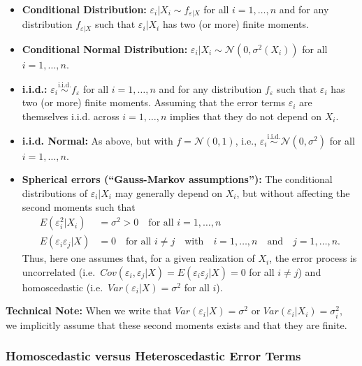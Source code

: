 \documentclass[
  letterpaper,
  DIV=11,
  numbers=noendperiod]{scrreprt}
\providecommand{\tightlist}{%
  \setlength{\itemsep}{0pt}\setlength{\parskip}{0pt}}\usepackage{longtable,booktabs,array}
\theoremstyle{definition}
\theoremstyle{plain}
\theoremstyle{plain}
\theoremstyle{remark}
\begin{document}
\begin{itemize}
\tightlist
\item
  \textbf{Conditional Distribution:}
  \(\varepsilon_i|X_i \sim f_{\varepsilon|X}\) for all \(i=1,\dots,n\)
  and for any distribution \(f_{\varepsilon|X}\) such that
  \(\varepsilon_i|X_i\) has two (or more) finite moments.
\item
  \textbf{Conditional Normal Distribution:}
  \(\varepsilon_i|X_i \sim \mathcal{N}(0,\sigma^2(X_i))\) for all
  \(i=1,\dots,n\).
\item
  \textbf{i.i.d.:}
  \(\varepsilon_i\overset{\operatorname{i.i.d.}}{\sim}f_\varepsilon\)
  for all \(i=1,\dots,n\) and for any distribution \(f_\varepsilon\)
  such that \(\varepsilon_i\) has two (or more) finite moments. Assuming
  that the error terms \(\varepsilon_i\) are themselves i.i.d. across
  \(i=1,\dots,n\) implies that they do not depend on \(X_i\).
\item
  \textbf{i.i.d. Normal:} As above, but with \(f=\mathcal{N}(0,1)\),
  i.e.,
  \(\varepsilon_i\overset{\operatorname{i.i.d.}}{\sim}\mathcal{N}(0,\sigma^2)\)
  for all \(i=1,\dots,n\).
\item
  \textbf{Spherical errors (``Gauss-Markov assumptions''):} The
  conditional distributions of \(\varepsilon_i|X_i\) may generally
  depend on \(X_i\), but without affecting the second moments such that
  \begin{align*}
  E(\varepsilon_i^2|X_i)         &=\sigma^2>0\quad\text{for all }i=1,\dots,n\\
  E(\varepsilon_i\varepsilon_j|X)&=0\quad\text{for all }i\neq j\quad\text{with}\quad i=1,\dots,n\quad\text{and}\quad j=1,\dots,n.
  \end{align*} Thus, here one assumes that, for a given realization of
  \(X_i\), the error process is uncorrelated
  (i.e.~\(Cov(\varepsilon_i,\varepsilon_j|X)=E(\varepsilon_i\varepsilon_j|X)=0\)
  for all \(i\neq j\)) and homoscedastic
  (i.e.~\(Var(\varepsilon_i|X)=\sigma^2\) for all \(i\)).
\end{itemize}

\textbf{Technical Note:} When we write that
\(Var(\varepsilon_i|X)=\sigma^2\) or
\(Var(\varepsilon_i|X_i)=\sigma^2_i,\) we implicitly assume that these
second moments exists and that they are finite.

\hypertarget{homoscedastic-versus-heteroscedastic-error-terms}{%
\subsubsection*{Homoscedastic versus Heteroscedastic Error
Terms}\label{homoscedastic-versus-heteroscedastic-error-terms}}
\end{document}
